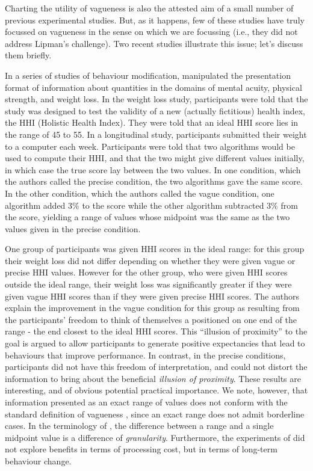 Charting the utility of vagueness is also the attested aim of a small number of previous experimental studies. But, as it happens, few of these studies have truly focussed on vagueness in the sense on which we are focussing (i.e., they did not address Lipman's challenge). Two recent studies illustrate this issue; let's discuss them briefly. 

In a series of studies of behaviour modification, \citet{Mishra01042011} manipulated the presentation format of information about quantities in the domains of mental acuity, physical strength, and weight loss. In the weight loss study, participants were told that the study was designed to test the validity of a new (actually fictitious) health index, the HHI (Holistic Health Index). They were told that an ideal HHI score lies in the range of 45 to 55. In a longitudinal study, participants submitted their weight to a computer each week. Participants were told that two algorithms would be used to compute their HHI, and that the two might give different values initially, in which case the true score lay between the two values. In one condition, which the authors called the precise condition, the two algorithms gave the same score. In the other condition, which the authors called the vague condition, one algorithm added 3\% to the score while the other algorithm subtracted 3\% from the score, yielding a range of values whose midpoint was the same as the two values given in the precise condition. 

One group of participants was given HHI scores in the ideal range: for this group their weight loss did not differ depending on whether they were given vague or precise HHI values. However for the other group, who were given HHI scores outside the ideal range, their weight loss was significantly greater if they were given vague HHI scores than if they were given precise HHI scores. The authors explain the improvement in the vague condition for this group as resulting from the participants' freedom to think of themselves a positioned on one end of the range - the end closest to the ideal HHI scores. This ``illusion of proximity'' \citep[][p.~4]{Mishra01042011} to the goal is argued to allow participants to generate positive expectancies that lead to behaviours that improve performance. In contrast, in the precise conditions, participants did not have this freedom of interpretation, and could not distort the information to bring about the beneficial \emph{illusion of proximity}. These results are interesting, and of obvious potential practical importance. We note, however, that information presented as an exact range of values does not conform with the standard definition of vagueness \citep{keefe1997vagueness, EgreKlinedinst}, since an exact range does not admit borderline cases. In the terminology of \citeauthor{Hobbs85granularity}, the difference between a range and a single midpoint value is a difference of \emph{granularity}. Furthermore, the experiments of \citeauthor{Mishra01042011} did not explore benefits in terms of processing cost, but in terms of long-term behaviour change.

